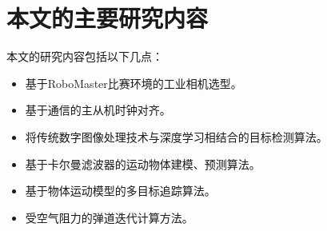 \section{本文的主要研究内容}
本文的研究内容包括以下几点：
\begin{itemize}[itemindent=2em]
    \item 基于RoboMaster比赛环境的工业相机选型。
    \item 基于通信的主从机时钟对齐。
    \item 将传统数字图像处理技术与深度学习相结合的目标检测算法。
    \item 基于卡尔曼滤波器的运动物体建模、预测算法。
    \item 基于物体运动模型的多目标追踪算法。
    \item 受空气阻力的弹道迭代计算方法。
\end{itemize}





